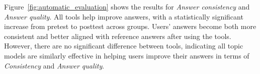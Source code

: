 Figure~\ref{fig:automatic_evaluation} shows the results for \textit{Answer consistency} and \textit{Answer quality}.
%
All tools help improve answers, with a statistically significant increase from pretest to posttest across groups. 
%
Users' answers become both more consistent and better aligned with reference answers after using the tools. %
%
However, 
there are no significant difference between tools, indicating all topic models are similarly effective in helping users improve their answers in terms of {\it Consistency} and {\it Answer quality}.
%



